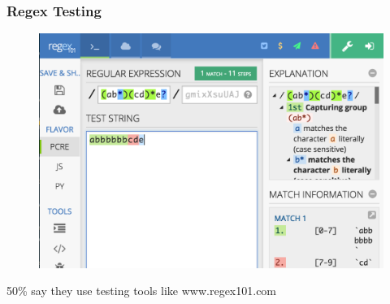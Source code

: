 \begin{frame}
\frametitle{Regex Testing}

\begin{figure}[ht]
  \includegraphics[scale=0.35]{nontex/regex101}
  \label{fig:regex101}
\end{figure}
\begin{center}
50\% say they use testing tools like www.regex101.com
\end{center}
\end{frame}



